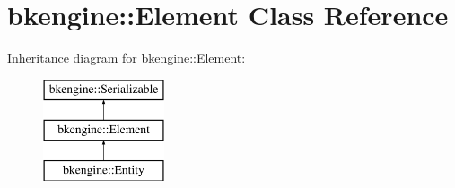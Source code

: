 \hypertarget{classbkengine_1_1Element}{}\section{bkengine\+:\+:Element Class Reference}
\label{classbkengine_1_1Element}
Inheritance diagram for bkengine\+:\+:Element\+:\begin{figure}[H]
\begin{center}
\leavevmode
\includegraphics[height=3.000000cm]{classbkengine_1_1Element}
\end{center}
\end{figure}
